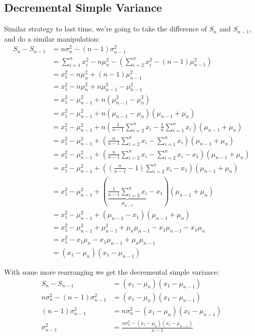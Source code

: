 \documentclass[english,12pt]{article}
\theoremstyle{plain}
\theoremstyle{definition}
\theoremstyle{definition} %
\newcommand{\brac}[1]{\left(#1\right)} %
\begin{document}
\subsection{Decremental Simple Variance}
Similar strategy to last time, we're going to take the difference of $S_n$ and $S_{n-1}$, and do a similar manipulation:
\begin{align*}
S_n - S_{n-1} &= n\sigma_n^2 - (n-1)\sigma_{n-1}^2\\
&=\sum_{i=1}^n x_i^2 - n\mu_n^2 - \brac{\sum_{i=2}^n x_i^2 - (n-1)\mu_{n-1}^2}\\
&=x_1^2 - n\mu_n^2 + (n-1)\mu_{n-1}^2\\
&=x_1^2 - n\mu_n^2 + n\mu_{n-1}^2 - \mu_{n-1}^2\\
&=x_1^2 - \mu_{n-1}^2  + n(\mu_{n-1}^2 - \mu_n^2)\\
&=x_1^2 - \mu_{n-1}^2  + n(\mu_{n-1} - \mu_n)(\mu_{n-1} + \mu_n)\\
&=x_1^2 - \mu_{n-1}^2  + n\brac{\frac{1}{n-1}\sum_{i=2}^n x_i - \frac{1}{n}\sum_{i=1}^n x_i}(\mu_{n-1} + \mu_n)\\
&=x_1^2 - \mu_{n-1}^2  + \brac{\frac{n}{n-1}\sum_{i=2}^n x_i - \sum_{i=1}^n x_i}(\mu_{n-1} + \mu_n)\\
&=x_1^2 - \mu_{n-1}^2  + \brac{\frac{n}{n-1}\sum_{i=2}^n x_i - \sum_{i=2}^n x_i - x_1}(\mu_{n-1} + \mu_n)\\
&=x_1^2 - \mu_{n-1}^2  + \brac{\brac{\frac{n}{n-1}-1}\sum_{i=2}^n x_i - x_1}(\mu_{n-1} + \mu_n)\\
&=x_1^2 - \mu_{n-1}^2  + \brac{\underbrace{\frac{1}{n-1}\sum_{i=2}^n x_i}_{\mu_{n-1}} - x_1}(\mu_{n-1} + \mu_n)\\
&=x_1^2 - \mu_{n-1}^2  + (\mu_{n-1} - x_1)(\mu_{n-1} + \mu_n)\\
&=x_1^2 - \mu_{n-1}^2  + \mu_{n-1}^2 + \mu_n\mu_{n-1} -x_1\mu_{n-1} - x_1\mu_{n}\\
&=x_1^2 - x_1\mu_{n} -x_1\mu_{n-1}  + \mu_n\mu_{n-1}\\
&=(x_1 - \mu_n)(x_1 - \mu_{n-1})
\end{align*}

With some more rearranging we get the decremental simple variance:
\begin{align*}
S_n - S_{n-1} &=(x_1 - \mu_n)(x_1 - \mu_{n-1})\\
n\sigma_n^2 - (n-1)\sigma_{n-1}^2 &= (x_1 - \mu_n)(x_1 - \mu_{n-1})\\
(n-1)\sigma_{n-1}^2 &= n\sigma_n^2 - (x_1 - \mu_n)(x_1 - \mu_{n-1})\\
\sigma_{n-1}^2 &= \frac{n\sigma_n^2 - (x_1 - \mu_n)(x_1 - \mu_{n-1})}{n-1}\\
\end{align*}
\end{document}
